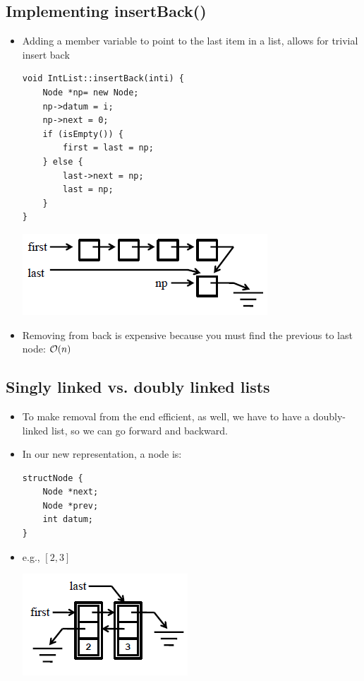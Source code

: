 \subsection{Implementing insertBack()}
\begin{itemize}
	\item Adding a member variable to point to the last item in a list, allows for trivial insert back
\begin{lstlisting}[style=C++]
void IntList::insertBack(inti) {
	Node *np= new Node;
	np->datum = i;
	np->next = 0;
	if (isEmpty()) {
		first = last = np;
	} else {
		last->next = np;
		last = np;
	}
}
\end{lstlisting}
\begin{center}
	\includegraphics{sections/lec18/back.png}
\end{center}
	\item Removing from back is expensive because you must find the previous to last node: $\mathcal{O}(n)$
\end{itemize}

\subsection{Singly linked vs. doubly linked lists}
\begin{itemize}
	\item To make removal from the end efficient, as well, we have to have a doubly-linked list, so we can go forward and backward.
	\item In our new representation, a node is:
\begin{lstlisting}[style=C++]
structNode {
	Node *next;
	Node *prev;
	int datum;
}
\end{lstlisting}
	\item e.g., $[2, 3]$
\begin{center}
	\includegraphics{sections/lec18/dl.png}
\end{center}
\end{itemize}